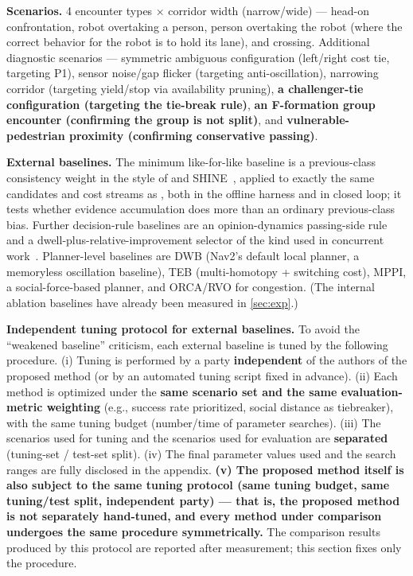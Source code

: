 \noindent\textbf{Scenarios.} 4 encounter types $\times$ corridor width (narrow/wide) --- head-on confrontation, robot overtaking a person, person overtaking the robot (where the correct behavior for the robot is to hold its lane), and crossing. Additional diagnostic scenarios --- symmetric ambiguous configuration (left/right cost tie, targeting P1), sensor noise/gap flicker (targeting anti-oscillation), narrowing corridor (targeting yield/stop via availability pruning), \textbf{a challenger-tie configuration (targeting the tie-break rule)}, \textbf{an F-formation group encounter (confirming the group is not split)}, and \textbf{vulnerable-pedestrian proximity (confirming conservative passing)}.

\noindent\textbf{External baselines.} The minimum like-for-like baseline is a previous-class consistency weight in the style of \citet{degroot2024topology} and SHINE~\citep{martinezbaselga2026shine}, applied to exactly the same candidates and cost streams as \sname, both in the offline harness and in closed loop; it tests whether evidence accumulation does more than an ordinary previous-class bias. Further decision-rule baselines are an opinion-dynamics passing-side rule~\citep{cathcart2023opinion} and a dwell-plus-relative-improvement selector of the kind used in concurrent work~\citep{li2026bigcbf}. Planner-level baselines are DWB (Nav2's default local planner, a memoryless oscillation baseline), TEB (multi-homotopy + switching cost), MPPI, a social-force-based planner, and ORCA/RVO for congestion. (The internal ablation baselines have already been measured in \cref{sec:exp}.)

\noindent\textbf{Independent tuning protocol for external baselines.} To avoid the ``weakened baseline'' criticism, each external baseline is tuned by the following procedure. (i) Tuning is performed by a party \textbf{independent} of the authors of the proposed method (or by an automated tuning script fixed in advance). (ii) Each method is optimized under the \textbf{same scenario set and the same evaluation-metric weighting} (e.g., success rate prioritized, social distance as tiebreaker), with the same tuning budget (number/time of parameter searches). (iii) The scenarios used for tuning and the scenarios used for evaluation are \textbf{separated} (tuning-set / test-set split). (iv) The final parameter values used and the search ranges are fully disclosed in the appendix. \textbf{(v) The proposed method itself is also subject to the same tuning protocol (same tuning budget, same tuning/test split, independent party) --- that is, the proposed method is not separately hand-tuned, and every method under comparison undergoes the same procedure symmetrically.} The comparison results produced by this protocol are reported after measurement; this section fixes only the procedure.

